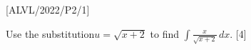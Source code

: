 \item {[}ALVL/2022/P2/1{]}

Use the substitution$u=\sqrt{x+2}$ to find $\int\frac{x}{\sqrt{x+2}}\,dx$.\hfill{}
{[}4{]}
